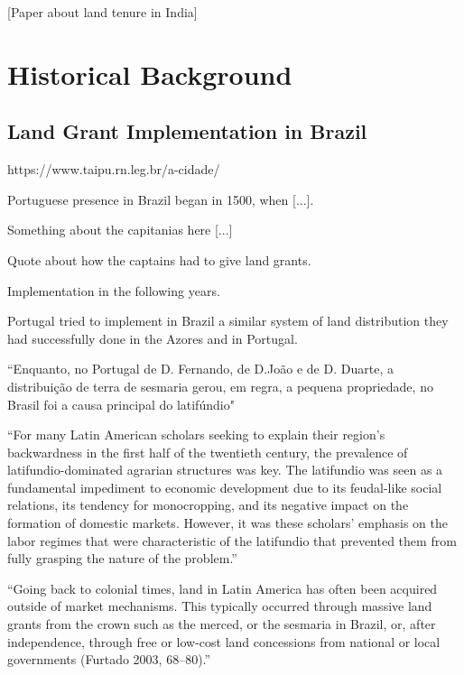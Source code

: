 \documentclass{article}
\begin{document}
\parencite{Dell2010-qt}
\parencite{Sokoloff2000-mb}

\textcite{Ratnoo2023-vw} [Paper about land tenure in India]

\textcite{Albertus2018-bf}


\section{Historical Background}

\subsection{Land Grant Implementation in Brazil}

https://www.taipu.rn.leg.br/a-cidade/

Portuguese presence in Brazil began in 1500, when [...].

Something about the capitanias here [...] 

Quote about how the captains had to give land grants. 

Implementation in the following years.

Portugal tried to implement in Brazil a similar system of land distribution they had successfully done in the Azores and in Portugal.

\textcite[p.~58-59]{Da_Costa_Porto1979-dz} ``Enquanto, no Portugal de D. Fernando, de D.João e de D. Duarte, a distribuição de terra de sesmaria gerou, em regra, a pequena propriedade, no Brasil foi a causa principal do latifúndio"

\parencite{Carlson2019-mk}
``For many Latin American scholars seeking to explain their region’s backwardness in the first half of the  twentieth century, the prevalence of latifundio-dominated agrarian structures was key. The latifundio was  seen  as a  fundamental  impediment  to  economic  development  due  to  its  feudal-like  social  relations,  its   tendency for monocropping, and its negative impact on the formation of domestic markets. However, it  was these scholars’ emphasis on the labor regimes that were characteristic of the latifundio that prevented  them from fully grasping the nature of the problem.''

\parencite{Carlson2019-mk}
``Going back to colonial times, land in Latin America has often been acquired outside of market mechanisms.  This typically occurred through massive land grants from the crown such as the merced, or the sesmaria in  Brazil, or, after independence, through free or low-cost land concessions from national or local governments  (Furtado  2003,  68–80).''
\end{document}
